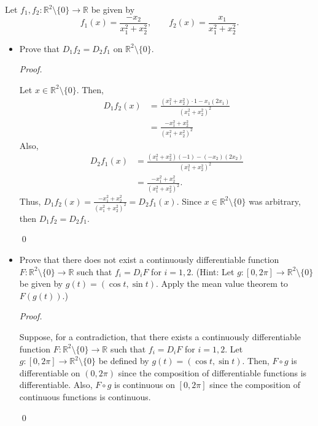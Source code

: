 \documentclass[12pt]{article}
\newenvironment{problem}[2][Problem]{\begin{trivlist}
\item[\hskip \labelsep {\bfseries #1}\hskip \labelsep {\bfseries
#2.}]}{\end{trivlist}}
\newenvironment{sol}
    {\emph{Proof.}
    }
    {
    \qed
    }
\begin{document}
  
  \begin{problem}{12}
  Let $f_1,f_2 : \mathbb{R}^2 \setminus \{0\} \to \mathbb{R}$ be given by $$f_1(x) = \frac{-x_2}{x_1^2 + x_2^2}, \hspace{2em} f_2(x) = \frac{x_1}{x_1^2 + x_2^2}.$$
  \begin{itemize}
      \item[(a)] Prove that $D_1f_2 = D_2f_1$ on $\mathbb{R}^2 \setminus \{0\}.$ 
      
      \vspace{1em}
      \begin{sol}
      Let $x \in \mathbb{R}^2 \setminus \{0\}$. Then, \begin{align*}
          D_1f_2(x) &= \frac{(x_1^2+x_2^2)\cdot 1 - x_1(2x_1)}{(x_1^2 + x_2^2)^2} \tag*{(By quotient rule)} \\ &= \frac{-x_1^2 + x_2^2}{(x_1^2 + x_2^2)^2}
      \end{align*}
      Also, \begin{align*}
          D_2f_1(x) &= \frac{(x_1^2 + x_2^2)(-1) - (-x_2)(2x_2)}{(x_1^2 + x_2^2)^2} \tag*{(By quotient rule)} \\ &= \frac{-x_1^2 + x_2^2}{(x_1^2 + x_2^2)^2}.
      \end{align*}
      Thus, $D_1f_2(x) = \frac{-x_1^2 + x_2^2}{(x_1^2 + x_2^2)^2} = D_2f_1(x)$. Since $x \in \mathbb{R}^2 \setminus \{0\}$ was arbitrary, then $D_1f_2 = D_2f_1$.
      \end{sol}
      \item[(b)] Prove that there does not exist a continuously differentiable function $F : \mathbb{R}^2 \setminus \{0\} \to \mathbb{R}$ such that $f_i = D_iF$ for $i = 1,2$. (Hint: Let $g : [0,2\pi ] \to \mathbb{R}^2 \setminus \{0\}$ be given by $g(t) = (\cos t, \sin t)$. Apply the mean value theorem to $F(g(t))$.)
      
      \vspace{1em}
      \begin{sol}
      Suppose, for a contradiction, that there exists a continuously differentiable function $F: \mathbb{R}^2 \setminus \{0\} \to \mathbb{R}$ such that $f_i = D_iF$ for $i = 1,2$. Let $g : [0,2\pi] \to \mathbb{R}^2 \setminus \{0\}$ be defined by $g(t) = (\cos t, \sin t)$. Then, $F \circ g$ is differentiable on $(0,2\pi)$ since the composition of differentiable functions is differentiable. Also, $F \circ g$ is continuous on $[0,2\pi]$ since the composition of continuous functions is continuous.
      

\end{sol}
\end{itemize}
\end{problem}
\end{document}
